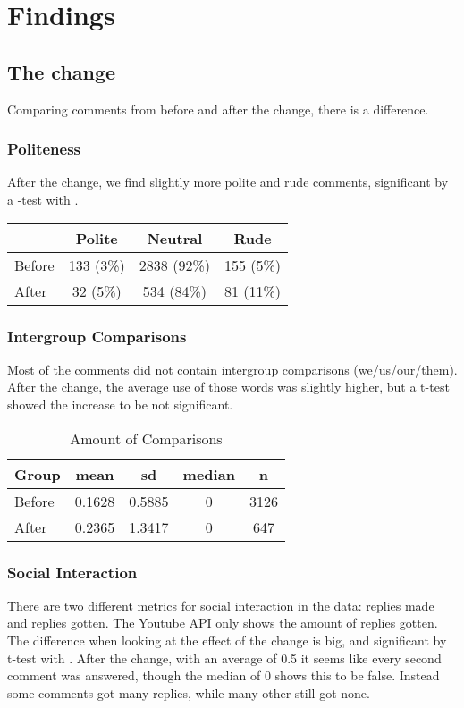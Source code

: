 \documentclass{chi-ext2}
\begin{document}
\section{Findings}
\subsection{The change}\label{sc:change}
Comparing comments from before and after the change, there is a  difference.
\subsubsection{Politeness}
 After the change, we find slightly more polite and rude comments, significant by a -test with .

\begin{center}
\begin{tabular}{| l | c | c | c | }
    \hline
     & Polite & Neutral & Rude \\
    \hline
    Before & 133 (3\%) & 2838 (92\%)& 155 (5\%) \\
    After & 32 (5\%) & 534 (84\%) & 81 (11\%)\\
 \hline
\end{tabular}
\end{center}

\subsubsection{Intergroup Comparisons}
Most of the comments did not contain intergroup comparisons (we/us/our/them). After the change, the average use of those words was slightly higher, but a t-test showed the increase to be not significant.

\begin{table}
\caption{Amount of Comparisons}
\centering
\begin{tabular}{| l | c | c | c | c |}
\hline
\hline
Group & mean & sd & median & n \\
\hline
Before & 0.1628 & 0.5885 & 0 & 3126 \\
After & 0.2365 & 1.3417 & 0 & 647 \\
\hline
\end{tabular}
\label{table:comparisonsChange}
\end{table}

\subsubsection{Social Interaction}
There are two different metrics for social interaction in the data: replies made and replies gotten. The Youtube API only shows the amount of replies gotten. The difference when looking at the effect of the change is big, and significant by t-test with  . After the change, with an average of 0.5 it seems like every second comment was answered, though the median of 0 shows this to be false. Instead some comments got many replies, while many other still got none.
\end{document}
